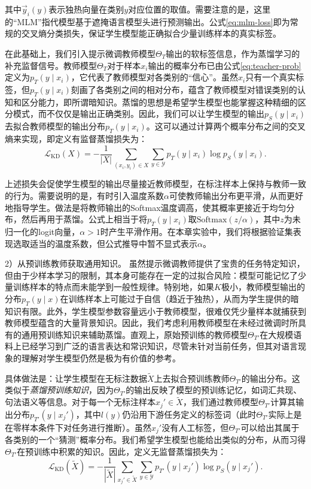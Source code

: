 \documentclass[../main.tex]{subfiles}
\begin{document}
\noindent 其中$\vec{y}_i(y)$表示独热向量在类别$y$对应位置的取值。需要注意的是，这里的“MLM”指代模型基于遮掩语言模型头进行预测输出。公式\eqref{eq:mlm-loss}即为常规的交叉熵分类损失，保证学生模型能正确拟合少量训练样本的真实标签。

在此基础上，我们引入提示微调教师模型$\Theta_T$输出的软标签信息，作为蒸馏学习的补充监督信号。教师模型$\Theta_T$对于样本$x_i$输出的概率分布已由公式\eqref{eq:teacher-prob}定义为$p_T(y\mid x_i)$，它代表了教师模型对各类别的“信心”。虽然$x_i$只有一个真实标签，但$p_T(y\mid x_i)$刻画了各类别之间的相对分布，蕴含了教师模型对错误类别的认知和区分能力，即所谓暗知识。蒸馏的思想是希望学生模型也能掌握这种精细的区分模式，而不仅仅是输出正确类别。因此，我们可以让学生模型的输出$p_S(y\mid x_i)$去拟合教师模型的输出分布$p_T(y\mid x_i)$。这可以通过计算两个概率分布之间的交叉熵来实现，即定义有监督蒸馏损失为：
\begin{equation}
	\label{eq:kd-loss-supervised}
	\mathcal{L}_{\text{KD}}(X) = -\frac{1}{|X|}\sum_{(x_i, y_i)\in X} \sum_{y \in \mathcal{Y}} p_T(y \mid x_i) \log p_S(y \mid x_i) .
\end{equation}

上述损失会促使学生模型的输出尽量接近教师模型，在标注样本上保持与教师一致的行为。需要说明的是，有时引入温度系数$\alpha$可使教师输出分布更平滑，从而更好地指导学生。做法是将教师输出的Softmax温度调高，使其概率更接近于均匀分布，然后再用于蒸馏。公式上相当于将$p_T(y\mid x_i)$取$\text{Softmax}(z/\alpha)$，其中$z$为未归一化的logit向量，$\alpha > 1$时产生平滑作用。在本章实验中，我们将根据验证集表现选取适当的温度系数，但公式推导中暂不显式表示$\alpha$。

2）从预训练教师获取通用知识。 虽然提示微调教师提供了宝贵的任务特定知识，但由于少样本学习的限制，其本身可能存在一定的过拟合风险：模型可能记忆了少量训练样本的特点而未能学到一般性规律。特别地，如果$K$极小，教师模型输出的分布$p_T(y\mid x)$在训练样本上可能过于自信（趋近于独热），从而为学生提供的暗知识有限。此外，学生模型参数容量远小于教师模型，很难仅凭少量样本就捕获到教师模型蕴含的大量背景知识。因此，我们考虑利用教师模型在未经过微调时所具有的通用预训练知识来辅助蒸馏。直观上，原始预训练的教师模型$\Theta_{T'}$在大规模语料上已经学习到广泛的语言表达和常识知识，尽管未针对当前任务，但其对语言现象的理解对学生模型仍然是极为有价值的参考。

具体做法是：让学生模型在无标注数据$\tilde{X}$上去拟合预训练教师$\Theta_{T'}$的输出分布。这类似于\emph{蒸馏预训练知识}，因为$\Theta_{T'}$的输出反映了模型的预训练记忆，如词汇共现、句法语义等信息。对于每一个无标注样本$x_j' \in \tilde{X}$，我们通过教师模型$\Theta_{T'}$计算其输出分布$p_{T'}(y\mid x_j')$，其中$l(y)$仍沿用下游任务定义的标签词（此时$\Theta_{T'}$实际上是在零样本条件下对任务进行推断）。虽然$x_j'$没有人工标签，但$\Theta_{T'}$可以给出其属于各类别的一个“猜测”概率分布。我们希望学生模型也能给出类似的分布，从而习得$\Theta_{T'}$在预训练中积累的知识。因此，定义无监督蒸馏损失为：
\begin{equation}
	\label{eq:kd-loss-unsupervised}
	\mathcal{L}_{\text{KD}}(\tilde{X}) = -\frac{1}{|\tilde{X}|}\sum_{x_j' \in \tilde{X}} \sum_{y \in \mathcal{Y}} p_{T'}(y \mid x_j') \log p_S(y \mid x_j') .
\end{equation}
\end{document}
